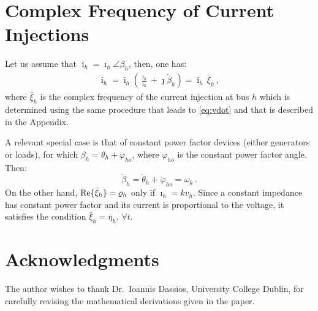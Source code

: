 \documentclass[journal, twocolumn, letter]{IEEEtran}
\renewcommand{\Re}{{\rm Re}}
\newcommand{\vh}{v_h}
\newcommand{\etah}{\bar{\eta}_h}
\renewcommand{\th}{\theta_h}
\newcommand{\wh}{\omega_h}
\newcommand{\ii}{\imath}
\newcommand{\jj}{\jmath}
\newcommand{\ih}{\bar{\ii}_{h}}
\newcommand{\ihdot}{\dot{\bar{\ii}}_{h}}
\newcommand{\xih}{\bar{\xi}_h}
\begin{document}
\section{Complex Frequency of Current Injections}
\label{app:idot}



Let us assume that $\ih = \ii_h \angle \beta_h$, then, one has:
\begin{equation}
  \label{eq:ihdot}
  \begin{aligned}
    \ihdot = \ih \left ( \frac{\dot{\ii}_h}{\ii_h} +
      \jj \dot{\beta}_h \right ) = \ih \, \xih \, ,
  \end{aligned}
\end{equation}
where $\xih$ is the complex frequency of the current injection at bus
$h$ which is determined using the same procedure that leads to
\eqref{eq:vdot} and that is described in the Appendix.



A relevant special case is that of constant power factor devices
(either generators or loads), for which
$\beta_h = \th + \varphi_{ho}$, where $\varphi_{ho}$ is the constant
power factor angle. Then:
\begin{equation}
  \label{eq:psidot}
  \dot{\beta}_h = \dot{\theta}_h + \dot{\varphi}_{ho} = \wh \, .
\end{equation}
On the other hand, $\Re \{ \bar{\xi}_h \} = \varrho_h$ only if
$\ii_h = k \vh$.  Since a constant impedance has constant power factor
and its current is proportional to the voltage, it satisfies the
condition $\xih = \etah$, $\forall t$.


\section*{Acknowledgments}

The author wishes to thank Dr.~Ioannis Dassios, University College
Dublin, for carefully revising the mathematical derivations given in
the paper.
\end{document}
